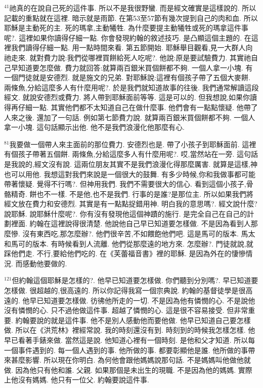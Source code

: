 \documentclass{book}
\begin{document}
$^{41}$祂真的在說自己死的這件事.
所以不是我很野蠻.
而是經文確實是這樣說的.
所以記載的重點就在這裡.
暗示就是雨節.
在第53至57節有幾次提到自己的肉和血.
所以耶穌是主動死的主.
死的瑪拿,主動犧牲.
為什麼要提主動犧牲或死的瑪拿這件事呢?.
這裡如果你讀得仔細一點.
你會發現約翰的敘述技巧.
是凸顯這個主題的.
在這裡我們讀得仔細一點.
用一點時間來看.
第五節開始.
耶穌舉目觀看,見一大群人向祂走來.
就對費力說:我們從哪裡買餅給死人吃呢?.
他說:原是要試驗費力.
其實祂自己早知道要怎麼做.
費力就回答:就算兩百銀米買個餅都不夠.
一個人拿一小塊.
有一個門徒就是安德烈.
就是施文的兄弟.
對耶穌說:這裡有個孩子帶了五個大麥餅.
兩條魚,分給這麼多人有什麼用呢?.
於是我們就知道故事的往後.
我們通常解讀這段經文.
就說安德烈或費力.
將人帶到耶穌面前等等.
這是可以的.
但我想說,如果你讀得再仔細一點.
其實他們都不太知道自己在做什麼事.
他們會有一點點懷疑.
他帶了人來之後.
還加了一句話.
例如第七節費力說.
就算兩百銀米買個餅都不夠.
一個人拿一小塊.
這句話顯示出他.
他不是我們浪漫化他那麼有心.

$^{81}$我要做一個帶人來主面前的那位費力.
安德烈也是.
帶了小孩子到耶穌面前.
這裡有個孩子帶著五個餅.
兩條魚,分給這麼多人有什麼用呢?.
哎,當然站在一旁.
這句話是我說的,經文沒有說.
這兩位朋友其實不是我們浪漫化得那麼厲害.
就算是這樣,神也可以用他.
我想這對我們來說是一個很大的鼓舞.
有多少時候,你和我做事都可能帶著懷疑.
覺得不行嗎?.
但神用我們.
我們不需要很大的信心.
看到這個小孩子,骨骼精奇.
餅也不一樣.
不是他,也不是我們.
行事的是誰?是那位主.
所以如果我們將經文放在費力和安德烈.
其實是有一點點捉錯用神.
明白我的意思嗎?.
經文說什麼?說耶穌.
說耶穌什麼呢?.
你有沒有發現他這個神蹟的施行.
是完全自己在自己的計劃裡面.
約翰在這裡說得很清楚.
他說他自己早已知道要怎樣做.
不是因為看到人那麼慘.
沒有東西吃,那怎麼辦?.
他們很辛苦,不如餵飽他們吧.
這是馬可的版本.
馬太和馬可的版本.
有時候看到人流離.
他們從那麼遠的地方來.
怎麼辦?.
門徒就說,就踩他們走.
不行,要給他們吃的.
在《芙蕾福音書》裡的耶穌.
是因為外在的悽慘情況.
而感動他要做的.

$^{121}$但約翰這個耶穌是怎樣的?.
他早已知道要怎樣做.
你們聽到分別嗎?.
早已知道要怎樣做.
很超越的,很高遠的.
所以你記得我寫一個宗典說.
約翰的基督徒學是很高遠的.
他早已知道要怎樣做.
彷彿他所走的一切.
不是因為他有憐憫的心.
不是說他沒有憐憫的心.
只不過他做這件事.
超越了憐憫的心.
這是很不容易接受.
但非常重要.
約翰要說的就是這件事.
他不是別人感動他而要他做.
他早已知道自己要怎樣做.
所以在《洪荒林》裡經常說.
我的時刻還沒有到.
時刻到的時候我怎樣怎樣.
他早已看著手錶來做.
當然這是說.
他知道心裡有一個時刻.
是他和父才知道.
所以每一個事件遇到的.
每一個人遇到的事.
他所做的事.
都要彰顯他是誰.
他所做的事帶來甚麼影響.
所以現在你明白.
為何他會跟他媽媽說那句話.
不是媽媽叫他做他就做.
因為他只有他和誰.
父親.
如果那個是未出生的現職.
不是因為他的媽媽.
實際上他沒有媽媽.
他只有一位父.
約翰要說這件事.
\end{document}
